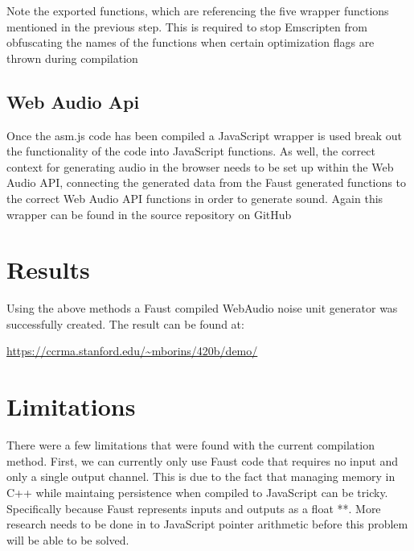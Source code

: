 \documentclass[runningheads,a4paper]{llncs}
\begin{document}
Note the exported functions, which are referencing the five wrapper functions mentioned in the previous step.  This is required to stop Emscripten from obfuscating the names of the functions when certain optimization flags are thrown during compilation

\subsection{Web Audio Api}

Once the asm.js code has been compiled a JavaScript wrapper is used break out the functionality of the code into JavaScript functions.  As well, the correct context for generating audio in the browser needs to be set up within the Web Audio API, connecting the generated data from the Faust generated functions to the correct Web Audio API functions in order to generate sound. Again this wrapper can be found in the source repository on GitHub


% 

\section{Results}

Using the above methods a Faust compiled WebAudio noise unit generator was successfully created.  The result can be found at:

     \url{https://ccrma.stanford.edu/~mborins/420b/demo/}
     
\section{Limitations}

There were a few limitations that were found with the current compilation method.  First, we can currently only use Faust code that requires no input and only a single output channel.  This is due to the fact that managing memory in C++ while maintaing persistence when compiled to JavaScript can be tricky. Specifically because Faust represents inputs and outputs as a float **.  More research needs to be done in to JavaScript pointer arithmetic before this problem will be able to be solved.
\end{document}
